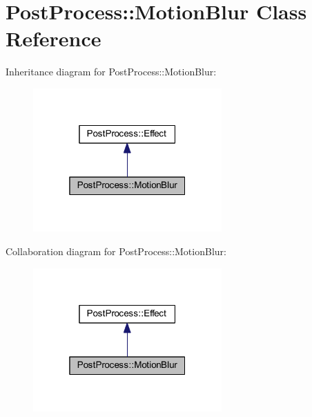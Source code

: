 \hypertarget{class_post_process_1_1_motion_blur}{}\section{Post\+Process\+:\+:Motion\+Blur Class Reference}
\label{class_post_process_1_1_motion_blur}


Inheritance diagram for Post\+Process\+:\+:Motion\+Blur\+:
\nopagebreak
\begin{figure}[H]
\begin{center}
\leavevmode
\includegraphics[width=205pt]{class_post_process_1_1_motion_blur__inherit__graph}
\end{center}
\end{figure}


Collaboration diagram for Post\+Process\+:\+:Motion\+Blur\+:
\nopagebreak
\begin{figure}[H]
\begin{center}
\leavevmode
\includegraphics[width=205pt]{class_post_process_1_1_motion_blur__coll__graph}
\end{center}
\end{figure}
